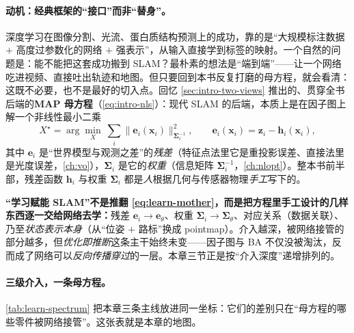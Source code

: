\paragraph{动机：经典框架的“接口”而非“替身”。}
深度学习在图像分割、光流、蛋白质结构预测上的成功，靠的是“大规模标注数据 $+$ 高度过参数化的网络 $+$ 强表示”，从输入直接学到标签的映射\cite{teed2026boosting}。一个自然的问题是：能不能把这套成功搬到 SLAM？最朴素的想法是“端到端”——让一个网络吃进视频、直接吐出轨迹和地图。但只要回到本书反复打磨的母方程，就会看清：这既不必要，也不是最好的切入点。回忆 \cref{sec:intro-two-views} 推出的、贯穿全书后端的\textbf{MAP 母方程}（\cref{eq:intro-nls}）：现代 SLAM 的后端，本质上是在因子图上解一个非线性最小二乘
\begin{equation}
  X^\star=\arg\min_X\ \sum_{i} \big\|\mathbf{e}_i(\mathbf{x}_i)\big\|_{\boldsymbol\Sigma_i^{-1}}^2,
  \qquad \mathbf{e}_i(\mathbf{x}_i)=\mathbf{z}_i-\mathbf{h}_i(\mathbf{x}_i),
  \label{eq:learn-mother}
\end{equation}
其中 $\mathbf{e}_i$ 是“世界模型与观测之差”的\emph{残差}（特征点法里它是重投影误差、直接法里是光度误差，\cref{ch:vo}），$\boldsymbol\Sigma_i$ 是它的\emph{权重}（信息矩阵 $\boldsymbol\Sigma_i^{-1}$，\cref{ch:nlopt}）。整本书前半部，残差函数 $\mathbf{h}_i$ 与权重 $\boldsymbol\Sigma_i$ 都是\emph{人}根据几何与传感器物理\emph{手工}写下的。

\begin{insight}
\textbf{“学习赋能 SLAM”不是推翻 \cref{eq:learn-mother}，而是把方程里手工设计的几样东西逐一交给网络去学：}残差 $\mathbf{e}_i\!\to\!\mathbf{e}_\theta$、权重 $\boldsymbol\Sigma_i\!\to\!\boldsymbol\Sigma_\theta$、对应关系（数据关联）、乃至\emph{状态表示本身}（从“位姿 $+$ 路标”换成 pointmap）。介入越深，被网络接管的部分越多，但\emph{优化即推断}这条主干始终未变——因子图与 BA 不仅没被淘汰，反而成了网络可以\emph{反向传播穿过}的一层。本章三节正是按“介入深度”递增排列的。
\end{insight}

\paragraph{三级介入，一条母方程。}
\cref{tab:learn-spectrum} 把本章三条主线放进同一坐标：它们的差别只在“母方程的哪些零件被网络接管”。这张表就是本章的地图。

